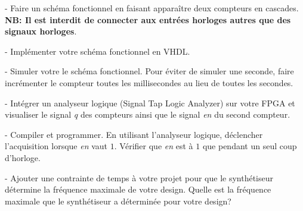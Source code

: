 \medskip

- Faire un schéma fonctionnel en faisant apparaître deux compteurs en cascades. \\ 
\textbf{NB: Il est interdit de connecter aux entrées horloges autres que des signaux horloges}.

\medskip

- Implémenter votre schéma fonctionnel en VHDL.

\medskip

- Simuler votre le schéma fonctionnel. Pour éviter de simuler une seconde, faire incrémenter le compteur toutes les millisecondes au lieu de toutes les secondes.

\medskip

- Intégrer un analyseur logique (Signal Tap Logic Analyzer) sur votre FPGA et visualiser le signal \textit{q} des compteurs ainsi que le signal \textit{en} du second compteur.

\medskip

- Compiler et programmer. En utilisant l'analyseur logique, déclencher l'acquisition lorsque \textit{en} vaut $1$. Vérifier que \textit{en} est à $1$ que pendant un seul coup d'horloge.

\medskip

- Ajouter une contrainte de temps à votre projet pour que le synthétiseur détermine la fréquence maximale de votre design. Quelle est la fréquence maximale que le synthétiseur a déterminée pour votre design?